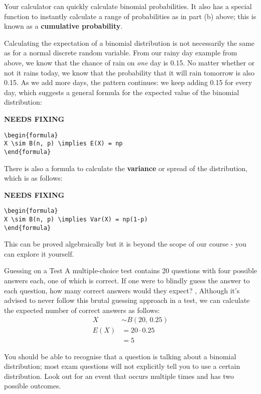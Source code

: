 \documentclass[../../main.tex]{subfiles}
\begin{document}
Your calculator can quickly calculate binomial probabilities. It also has a special function to instantly calculate a range of probabilities as in part (b) above; this is known as a \textbf{cumulative probability}.

Calculating the expectation of a binomial distribution is not necessarily the same as for a normal discrete random variable. From our rainy day example from above, we know that the chance of rain on \textit{one} day is 0.15. No matter whether or not it rains today, we know that the probability that it will rain tomorrow is also 0.15. As we add more days, the pattern continues: we keep adding 0.15 for every day, which suggests a general formula for the expected value of the binomial distribution:

{\hfill\Large\bfseries NEEDS FIXING\hfill}
\begin{lstlisting}
\begin{formula}
X \sim B(n, p) \implies E(X) = np
\end{formula}
 \end{lstlisting}

There is also a formula to calculate the \textbf{variance} or spread of the distribution, which is as follows:

{\hfill\Large\bfseries NEEDS FIXING\hfill}
\begin{lstlisting}
\begin{formula}
X \sim B(n, p) \implies Var(X) = np(1-p)
\end{formula}
 \end{lstlisting}

This can be proved algebraically but it is beyond the scope of our course - you can explore it yourself.
\begin{example}{Guessing on a Test}
A multiple-choice test contains 20 questions with four possible answers each, one of which is correct. If one were to blindly guess the answer to each question, how many correct answers would they expect?
\sep
Although it's advised to never follow this brutal guessing approach in a test, we can calculate the expected number of correct answers as follows:
\begin{align}
    X &\sim B(20, \, 0.25) \\
    E(X) &= 20 \cdot 0.25 \\
    &= 5
\end{align}
\end{example}

You should be able to recognise that a question is talking about a binomial distribution; most exam questions will not explicitly tell you to use a certain distribution. Look out for an event that occurs multiple times and has two possible outcomes.
\end{document}
